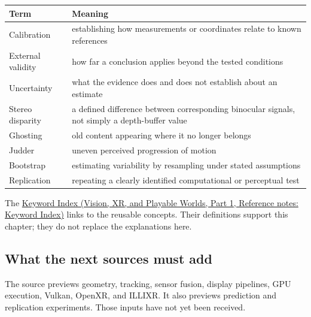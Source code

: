 {\def\LTcaptype{none} %
\begin{longtable}[]{@{}
  >{\raggedright\arraybackslash}p{}
  >{\raggedright\arraybackslash}p{}@{}}
\toprule\noalign{}
\begin{minipage}[b]{\linewidth}\raggedright
Term
\end{minipage} & \begin{minipage}[b]{\linewidth}\raggedright
Meaning
\end{minipage} \\
\midrule\noalign{}
\endhead
\bottomrule\noalign{}
\endlastfoot
Calibration & establishing how measurements or coordinates relate to known references \\
External validity & how far a conclusion applies beyond the tested conditions \\
Uncertainty & what the evidence does and does not establish about an estimate \\
Stereo disparity & a defined difference between corresponding binocular signals, not simply a depth-buffer value \\
Ghosting & old content appearing where it no longer belongs \\
Judder & uneven perceived progression of motion \\
Bootstrap & estimating variability by resampling under stated assumptions \\
Replication & repeating a clearly identified computational or perceptual test \\
\end{longtable}
}

The \href{../07-Vision-XR-and-Playable-Worlds-P01/main.pdf\#nameddest=appendix-a6d556a4ef50}{Keyword Index (Vision, XR, and Playable Worlds, Part 1, Reference notes: Keyword Index)} links to the reusable concepts. Their definitions support this chapter; they do not replace the explanations here.

\subsection{What the next sources must add}\label{04-visual-computing-ii-ch042-what-the-next-sources-must-add}

\hypertarget{04-visual-computing-ii-ch042-what-the-next-sources-must-add}{}

The source previews geometry, tracking, sensor fusion, display pipelines, GPU execution, Vulkan, OpenXR, and ILLIXR. It also previews prediction and replication experiments. Those inputs have not yet been received.

